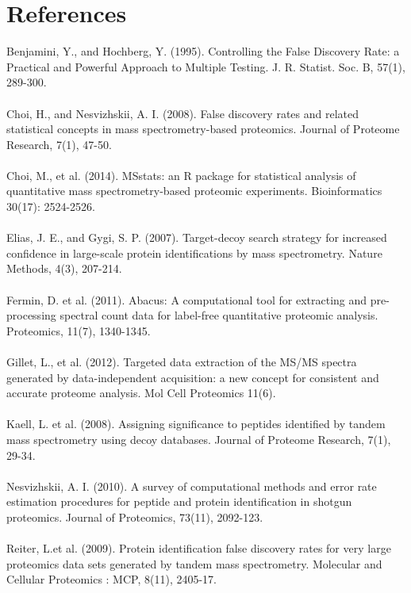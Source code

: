 \documentclass[a4paper]{article}
\begin{document}
\section{References}
Benjamini, Y., and Hochberg, Y. (1995). Controlling the False Discovery Rate: a Practical and Powerful Approach to Multiple Testing. J. R. Statist. Soc. B, 57(1), 289-300.\\
\\
Choi, H., and Nesvizhskii, A. I. (2008). False discovery rates and related statistical concepts in mass spectrometry-based proteomics. Journal of Proteome Research, 7(1), 47-50.\\
\\
Choi, M., et al. (2014). MSstats: an R package for statistical analysis of quantitative mass spectrometry-based proteomic experiments. Bioinformatics 30(17): 2524-2526.\\
 \\
Elias, J. E., and Gygi, S. P. (2007). Target-decoy search strategy for increased confidence in large-scale protein identifications by mass spectrometry. Nature Methods, 4(3), 207-214.\\
\\
Fermin, D. et al. (2011). Abacus: A computational tool for extracting and pre-processing spectral count data for label-free quantitative proteomic analysis. Proteomics, 11(7), 1340-1345.\\
\\
Gillet, L., et al. (2012). Targeted data extraction of the MS/MS spectra generated by data-independent acquisition: a new concept for consistent and accurate proteome analysis. Mol Cell Proteomics 11(6).\\
 \\
Kaell, L. et al. (2008). Assigning significance to peptides identified by tandem mass spectrometry using decoy databases. Journal of Proteome Research, 7(1), 29-34.\\
\\
Nesvizhskii, A. I. (2010). A survey of computational methods and error rate estimation procedures for peptide and protein identification in shotgun proteomics. Journal of Proteomics, 73(11), 2092-123.\\
\\
Reiter, L.et al. (2009). Protein identification false discovery rates for very large proteomics data sets generated by tandem mass spectrometry. Molecular and Cellular Proteomics : MCP, 8(11), 2405-17.\\
\\
\end{document}
